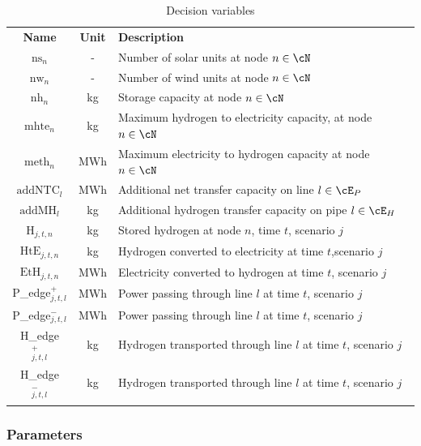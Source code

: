 \begin{table}
  \caption{Decision variables}
  \label{table_vars}
  \begin{tabularx}{\textwidth}{ccl}
  \hline\noalign{\smallskip}
  \textbf{Name} & \textbf{Unit} & \textbf{Description}  \\
  \noalign{\smallskip}\hline\noalign{\smallskip}
  $\text{ns}_n$ & - & Number of solar units at node $n \in \cN$ \\
  $\text{nw}_n$ & - & Number of wind units at node $n \in \cN$ \\
  $\text{nh}_n$ & kg & Storage capacity at node $n \in \cN$\\
  $\text{mhte}_n$ & kg & \parbox[t]{0.70\textwidth}{Maximum hydrogen to electricity capacity,  at node $n \in \cN$} \\
  $\text{meth}_n$ & MWh & Maximum electricity to hydrogen capacity at node $n \in \cN$\\
  $\text{addNTC}_l$ & MWh & Additional net transfer capacity on line $l\in\cE_P$\\
  $\text{addMH}_l$ & kg & Additional hydrogen transfer capacity on pipe $l\in\cE_H$\\
  \noalign{\smallskip}\hline\noalign{\smallskip}
  $\text{H}_{j,t,n}$ & kg& Stored hydrogen at node $n$, time \(t\), scenario \(j\)\\
  $\text{HtE}_{j,t,n}$ & kg& Hydrogen converted to electricity at time \(t\),scenario \(j\) \\
  $\text{EtH}_{j,t,n}$ & MWh& Electricity converted to hydrogen at time \(t\), scenario \(j\)\\
  P\_edge$^+_{j,t,l}$&MWh& Power passing through line $l$ at time $t$, scenario $j$ \\
  P\_edge$^-_{j,t,l}$&MWh& Power passing through line $l$ at time $t$, scenario $j$ \\
  H\_edge$^+_{j,t,l}$&kg& Hydrogen transported through line $l$ at time $t$, scenario $j$\\
  H\_edge$^-_{j,t,l}$&kg& Hydrogen transported through line $l$ at time $t$, scenario $j$\\
  \noalign{\smallskip}\hline
  \end{tabularx}
  \end{table}
  


\subsubsection{Parameters}

